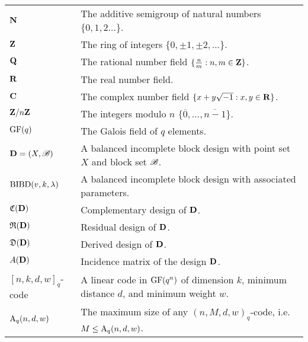 \documentclass[../../main]{subfiles}
\begin{document}
 
 \begin{longtabu} to \textwidth{X[1,l] X[2,l]} %
 $\mathbf{N}$ & The additive semigroup of natural numbers $\{0,1,2\dots$\}. \\
 $\mathbf{Z}$ & The ring of integers $\{0, \pm1, \pm2, \dots$\}. \\
 $\mathbf{Q}$ & The rational number field $\{\frac{n}{m} : n,m \in \mathbf{Z}\}$. \\
 $\mathbf{R}$ & The real number field. \\
 $\mathbf{C}$ & The complex number field $\{x+y\sqrt{-1} : x,y \in \mathbf{R}\}$. \\
 $\mathbf{Z}/n\mathbf{Z}$ & The integers modulo $n$ $\{\overline{0}, \dots, \overline{n-1}\}$. \\
 $\text{GF}(q)$ & The Galois field of $q$ elements. \\
 $\mathbf{D}=(X,\mathscr{B})$ & A balanced incomplete block design with point set $X$ and block set $\mathscr{B}$. \\
 $\text{BIBD}(v,k,\lambda)$ & A balanced incomplete block design with associated parameters. \\
 $\mathfrak{C}(\mathbf{D})$ & Complementary design of $\mathbf{D}$. \\
 $\mathfrak{R}(\mathbf{D})$ & Residual design of $\mathbf{D}$. \\
 $\mathfrak{D}(\mathbf{D})$ & Derived design of $\mathbf{D}$. \\
 $A(\mathbf{D})$ & Incidence matrix of the design $\mathbf{D}$. \\
 $[n,k,d,w]_q$-code & A linear code in $\text{GF}(q^n)$ of dimension $k$, minimum distance $d$, and minimum weight $w$. \\
 $\text{A}_q(n,d,w)$ & The maximum size of any $(n,M,d,w)_q$-code, i.e. $M \leq \text{A}_q(n,d,w)$. \\

\end{longtabu}
\end{document}

